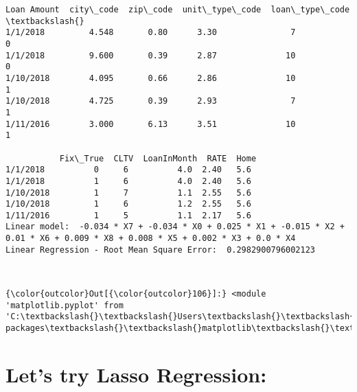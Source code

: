 \documentclass[11pt]{article}
\begin{document}
    \begin{Verbatim}[commandchars=\\\{\}]
           Loan Amount  city\_code  zip\_code  unit\_type\_code  loan\_type\_code  \textbackslash{}
1/1/2018         4.548       0.80      3.30               7               0   
1/1/2018         9.600       0.39      2.87              10               0   
1/10/2018        4.095       0.66      2.86              10               1   
1/10/2018        4.725       0.39      2.93               7               1   
1/11/2016        3.000       6.13      3.51              10               1   

           Fix\_True  CLTV  LoanInMonth  RATE  Home  
1/1/2018          0     6          4.0  2.40   5.6  
1/1/2018          1     6          4.0  2.40   5.6  
1/10/2018         1     7          1.1  2.55   5.6  
1/10/2018         1     6          1.2  2.55   5.6  
1/11/2016         1     5          1.1  2.17   5.6  
Linear model:  -0.034 * X7 + -0.034 * X0 + 0.025 * X1 + -0.015 * X2 + 0.01 * X6 + 0.009 * X8 + 0.008 * X5 + 0.002 * X3 + 0.0 * X4
Linear Regression - Root Mean Square Error:  0.2982900796002123

    \end{Verbatim}

    \begin{center}
    \end{center}
    { \hspace*{\fill} \\}
    
\begin{Verbatim}[commandchars=\\\{\}]
{\color{outcolor}Out[{\color{outcolor}106}]:} <module 'matplotlib.pyplot' from 'C:\textbackslash{}\textbackslash{}Users\textbackslash{}\textbackslash{}achow\textbackslash{}\textbackslash{}Anaconda3\textbackslash{}\textbackslash{}lib\textbackslash{}\textbackslash{}site-packages\textbackslash{}\textbackslash{}matplotlib\textbackslash{}\textbackslash{}pyplot.py'>
\end{Verbatim}
            
    \section{Let's try Lasso Regression:}\label{lets-try-lasso-regression}
\end{document}
